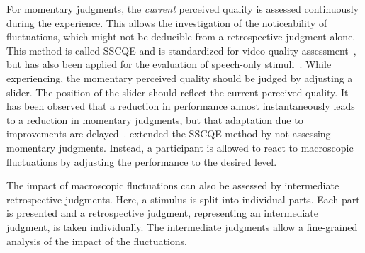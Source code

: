 For momentary judgments, the \emph{current} perceived quality is assessed continuously during the experience.
This allows the investigation of the noticeability of fluctuations, which might not be deducible from a retrospective judgment alone.
This method is called \ac{SSCQE} and is standardized for video quality assessment~\citep[][]{itu-r_recommendation_bt.500-13_methodology_2012}, but has also been applied for the evaluation of speech-only stimuli~\citep[\eg,][]{gros_instantaneous_2001}.
While experiencing, the momentary perceived quality should be judged by adjusting a slider.
The position of the slider should reflect the current perceived quality.
It has been observed that a reduction in performance almost instantaneously leads to a reduction in momentary judgments, but that adaptation due to improvements are delayed~\citep[\eg,][]{hands_recency_2001, gros_instantaneous_2001, hamberg_time-varying_1999}.
\citet{borowiak_long_2013} extended the \ac{SSCQE} method by not assessing momentary judgments.
Instead, a participant is allowed to react to macroscopic fluctuations by adjusting the performance to the desired level.

The impact of macroscopic fluctuations can also be assessed by intermediate retrospective judgments.
Here, a stimulus is split into individual parts.
Each part is presented and a retrospective judgment, representing an intermediate judgment, is taken individually.
The intermediate judgments allow a fine-grained analysis of the impact of the fluctuations.

